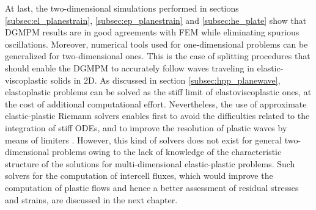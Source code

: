 At last, the two-dimensional simulations performed in sections \ref{subsec:el_planestrain}, \ref{subsec:ep_planestrain} and \ref{subsec:he_plate} show that DGMPM results are in good agreements with FEM while eliminating spurious oscillations.
Moreover, numerical tools used for one-dimensional problems can be generalized for two-dimensional ones. This is the case of splitting procedures that should enable the DGMPM to accurately follow waves traveling in elastic-viscoplastic solids in 2D. As discussed in section \ref{subsec:hpp_planewave}, elastoplastic problems can be solved as the stiff limit of elastoviscoplastic ones, at the cost of additional computational effort.
Nevertheless, the use of approximate elastic-plastic Riemann solvers enables first to avoid the difficulties related to the integration of stiff ODEs, and to improve the resolution of plastic waves by means of limiters \cite{Thomas_EP}. However, this kind of solvers does not exist for general two-dimensional problems owing to the lack of knowledge of the characteristic structure of the solutions for multi-dimensional elastic-plastic problems. Such solvers for the computation of intercell fluxes, which would improve the computation of plastic flows and hence a better assessment of residual stresses and strains, are discussed in the next chapter. 

